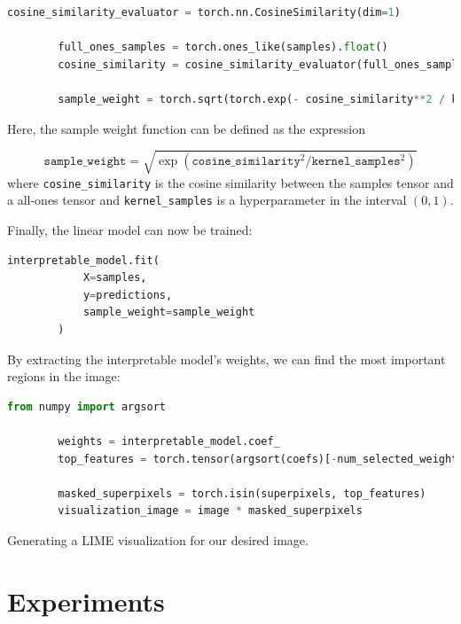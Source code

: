\begin{program}
    \centering

    \begin{lstlisting}[language=Python, style=wider]
        cosine_similarity_evaluator = torch.nn.CosineSimilarity(dim=1)
        
        full_ones_samples = torch.ones_like(samples).float()
        cosine_similarity = cosine_similarity_evaluator(full_ones_samples, samples)
        
        sample_weight = torch.sqrt(torch.exp(- cosine_similarity**2 / kernel_samples**2))

    \end{lstlisting}
\end{program}

Here, the sample weight function can be defined as the expression 

\begin{equation}
    \texttt{sample\_weight} = \sqrt{\exp({\texttt{cosine\_similarity}^2 / \texttt{kernel\_samples}^2})}
\end{equation}
where \texttt{cosine\_similarity} is the cosine similarity between the samples tensor and a all-ones tensor and \texttt{kernel\_samples} is a hyperparameter in the interval \((0, 1)\).

Finally, the linear model can now be trained:
\begin{program}
    \centering

    \begin{lstlisting}[language=Python, style=wider]
        interpretable_model.fit(
            X=samples,
            y=predictions,
            sample_weight=sample_weight
        )
    \end{lstlisting}
\end{program}

By extracting the interpretable model's weights, we can find the most important regions in the image:

\begin{program}
    \centering

    \begin{lstlisting}[language=Python, style=wider]
        from numpy import argsort

        weights = interpretable_model.coef_
        top_features = torch.tensor(argsort(coefs)[-num_selected_weights:])   # select top "num_selected_weights" weights
    
        masked_superpixels = torch.isin(superpixels, top_features)
        visualization_image = image * masked_superpixels
    \end{lstlisting}
\end{program}

Generating a LIME visualization for our desired image.

\section{Experiments} 